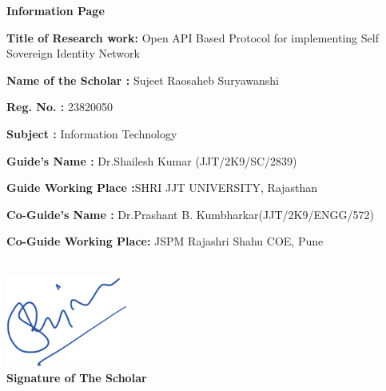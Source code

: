 \begin{titlepage}
\begin{center}
\textbf{Information Page}    
\end{center}   


\begin{left}


\textbf{Title of Research work:} Open API Based Protocol for implementing Self Sovereign Identity Network 
\vspace{0.3cm}

\textbf{Name of the Scholar    :}     Sujeet Raosaheb Suryawanshi
\vspace{0.3cm}

\textbf{Reg. No.                         :}     23820050
\vspace{0.3cm}

\textbf{Subject                   	   :}  Information Technology
\vspace{0.3cm}

\textbf{Guide’s Name  	   :}       Dr.Shailesh Kumar (JJT/2K9/SC/2839)
\vspace{0.3cm}

\textbf{Guide Working Place        :}SHRI JJT UNIVERSITY, Rajasthan
\vspace{0.3cm}

\textbf{Co-Guide’s Name  	   :}       Dr.Prashant B. Kumbharkar(JJT/2K9/ENGG/572) 
\vspace{0.09cm}

\textbf{Co-Guide Working Place:} JSPM Rajashri Shahu COE, Pune\\\\


\begin{minipage}{0.5\textwidth}
\begin{flushleft} 
\includegraphics[width=0.3\textwidth]{images/mysign.png}\\
\textbf{Signature of The Scholar}\\
\end{flushleft}
\end{minipage}
\begin{minipage}{0.5\textwidth}
\begin{flushright} 


\end{flushright}
\end{minipage}
\end{left}
\end{titlepage}
